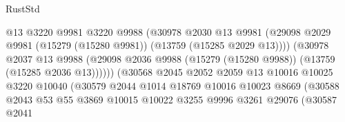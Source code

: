 \begin{lexlean}{RustStd}
\begin{coremodule}
                                          @13
                                          @3220
                                          @9981
                                          @3220
                                          @9988
                                          (@30978
                                            @2030
                                            @13
                                            @9981
                                            (@29098
                                              @2029
                                              @9981
                                              (@15279 (@15280 @9981))
                                              (@13759 (@15285 @2029 @13))))
                                          (@30978
                                            @2037
                                            @13
                                            @9988
                                            (@29098
                                              @2036
                                              @9988
                                              (@15279 (@15280 @9988))
                                              (@13759 (@15285 @2036 @13))))))
                                      (@30568
                                        @2045
                                        @2052
                                        @2059
                                        @13
                                        @10016
                                        @10025
                                        @3220
                                        @10040
                                        (@30579
                                          @2044
                                          @1014
                                          @18769
                                          @10016
                                          @10023
                                          @8669
                                          (@30588
                                            @2043
                                            @53
                                            @55
                                            @3869
                                            @10015
                                            @10022
                                            @3255
                                            @9996
                                            @3261
                                            @29076
                                            (@30587
                                              @2041

\end{coremodule}
\end{lexlean}
